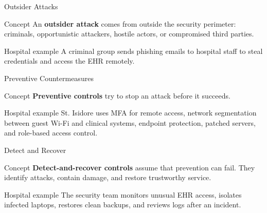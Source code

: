 \documentclass[presentation]{beamer}
\begin{document}
\begin{frame}[c]{Outsider Attacks}
\begin{block}{Concept}
An \textbf{outsider attack} comes from outside the security perimeter: criminals, opportunistic
attackers, hostile actors, or compromised third parties.
\end{block}

\begin{exampleblock}{Hospital example}
A criminal group sends phishing emails to hospital staff to steal credentials and access the EHR
remotely.
\end{exampleblock}
\end{frame}

\begin{frame}[c]{Preventive Countermeasures}
\begin{block}{Concept}
\textbf{Preventive controls} try to stop an attack before it succeeds.
\end{block}

\begin{exampleblock}{Hospital example}
St. Isidore uses MFA for remote access, network segmentation between guest Wi-Fi and clinical
systems, endpoint protection, patched servers, and role-based access control.
\end{exampleblock}
\end{frame}

\begin{frame}[c]{Detect and Recover}
\begin{block}{Concept}
\textbf{Detect-and-recover controls} assume that prevention can fail. They identify attacks,
contain damage, and restore trustworthy service.
\end{block}

\begin{exampleblock}{Hospital example}
The security team monitors unusual EHR access, isolates infected laptops, restores clean backups,
and reviews logs after an incident.
\end{exampleblock}
\end{frame}
\end{document}
